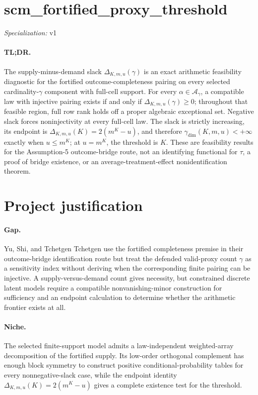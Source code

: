 \documentclass{article}
\begin{document}
\sloppy

\section*{scm\_\allowbreak{}fortified\_\allowbreak{}proxy\_\allowbreak{}threshold}

\noindent\textit{Specialization:} v1\par

\paragraph{TL;DR.} The supply-minus-demand slack \(\Delta_{K,m,u}(\gamma)\) is an exact arithmetic feasibility diagnostic for the fortified outcome-completeness pairing on every selected cardinality-\(\gamma\) component with full-cell support. For every \(\alpha\in\mathcal A_\gamma\), a compatible law with injective pairing exists if and only if \(\Delta_{K,m,u}(\gamma)\ge0\); throughout that feasible region, full row rank holds off a proper algebraic exceptional set. Negative slack forces noninjectivity at every full-cell law. The slack is strictly increasing, its endpoint is \(\Delta_{K,m,u}(K)=2(m^K-u)\), and therefore \(\gamma_{\mathrm{dim}}(K,m,u)<+\infty\) exactly when \(u\le m^K\); at \(u=m^K\), the threshold is \(K\). These are feasibility results for the Assumption-5 outcome-bridge route, not an identifying functional for \(\tau\), a proof of bridge existence, or an average-treatment-effect nonidentification theorem.

\section{Project justification}

\paragraph{Gap.} Yu, Shi, and Tchetgen Tchetgen \cite{YuShiTchetgen2025} use the fortified completeness premise in their outcome-bridge identification route but treat the defended valid-proxy count \(\gamma\) as a sensitivity index without deriving when the corresponding finite pairing can be injective. A supply-versus-demand count gives necessity, but constrained discrete latent models require a compatible nonvanishing-minor construction for sufficiency and an endpoint calculation to determine whether the arithmetic frontier exists at all.

\paragraph{Niche.} The selected finite-support model admits a law-independent weighted-array decomposition of the fortified supply. Its low-order orthogonal complement has enough block symmetry to construct positive conditional-probability tables for every nonnegative-slack case, while the endpoint identity \(\Delta_{K,m,u}(K)=2(m^K-u)\) gives a complete existence test for the threshold.
\end{document}
